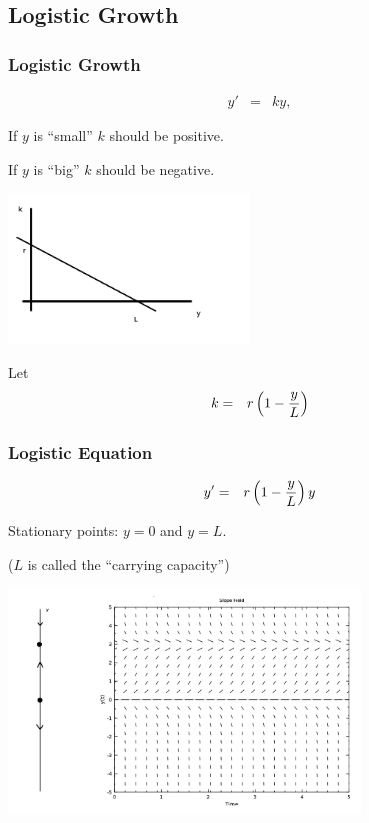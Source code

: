 


\subsection{Logistic Growth}

\begin{frame}
  \frametitle{Logistic Growth}

  \vspace*{-4em}
  \begin{eqnarray*}
    y' & = & ky,
  \end{eqnarray*}
  
  If $y$ is ``small'' $k$ should be positive.

  If $y$ is ``big'' $k$ should be negative.

  \includegraphics[height=4cm]{img/week3GrowthRate}

  Let 
  \begin{eqnarray*}
    k & = & r \left( 1 - \frac{y}{L} \right)
  \end{eqnarray*}


\end{frame}


\begin{frame}
  \frametitle{Logistic Equation}

  \begin{eqnarray*}
    y' & = & r \left( 1 - \frac{y}{L} \right) y
  \end{eqnarray*}

  Stationary points: $y=0$ and $y=L$. 

  ($L$ is called the ``carrying capacity'')

  \includegraphics[height=6cm]{img/week3PhaseLineExample1}

\end{frame}


